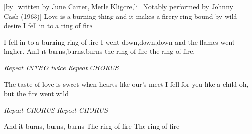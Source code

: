 [by={written by June Carter, Merle Kligore},li={Notably performed by Johnny Cash (1963)}]
\beginverse
Love is a burning thing
and it makes a firery ring
bound by wild desire
I fell in to a ring of fire
\endverse

\beginchorus
I fell in to a burning ring of fire
I went down,down,down
and the flames went higher.
And it burns,burns,burns
the ring of fire
the ring of fire.
\endchorus

\beginverse
\textit{Repeat INTRO twice}
\textit{Repeat CHORUS}
\endverse

\beginverse
The taste of love is sweet
when hearts like our's meet
I fell for you like a child
oh, but the fire went wild
\endverse

\beginverse
\textit{Repeat CHORUS}
\textit{Repeat CHORUS}
\endverse

\beginchorus
And it burns, burns, burns
The ring of fire
The ring of fire
\endchorus
\endsong